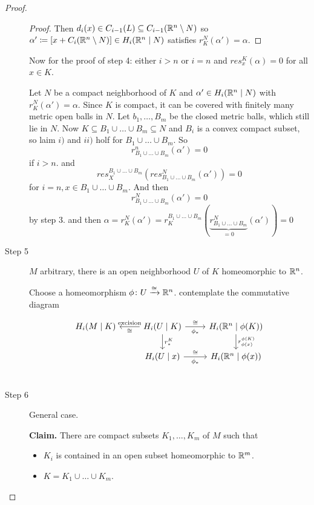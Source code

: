 \documentclass[language=english]{TemplateLecture}
\begin{document}
\begin{proof}
\begin{description}
\begin{proof}
        Then \(d_i(x) \in C_{i-1}(L) \subseteq C_{i-1}(\mathbb{R}^n \setminus N)\) so \(\alpha' \coloneq [x + C_i(\mathbb{R}^n \setminus N)] \in H_i(\mathbb{R}^n \mid N)\) satisfies \(r_K^N(\alpha') = \alpha\).
    \end{proof}

    Now for the proof of step 4: either \(i > n\) or \(i = n\) and \(res_x^K(\alpha) = 0\) for all \(x \in K\).

    Let \(N\) be a compact neighborhood of \(K\) and \(\alpha' \in H_i(\mathbb{R}^n \mid N)\) with \(r_K^N(\alpha') = \alpha\). Since \(K\) is  compact, it can be covered with finitely many metric open balls in \(N\). Let \(b_1, \dots, B_m\) be the closed metric balls, whlich still lie in \(N\). Now
    \(K \subseteq B_1 \cup \dots \cup B_m \subseteq N\) and \(B_i\) is a convex compact subset, so laim \(i)\) and \(ii)\) holf for \(B_1 \cup \dots \cup B_m\). So
    \[r_{B_1 \cup \dots \cup B_m}^n(\alpha') = 0\]
    if \(i > n\). and
    \[res_X^{B_1\cup \dots \cup B_m}(res_{B_1 \cup \dots \cup B_m}^N(\alpha')) = 0\]
    for \(i = n, x \in B_1 \cup \dots \cup B_m\). And then
    \[r_{B_1 \cup \dots \cup B_m}^N(\alpha') = 0\] by step 3. and then \(\alpha = r_K^N(\alpha') = r_K^{B_1 \cup \dots \cup B_m}(\underbrace{r_{B_1\cup \dots \cup B_m}^N}_{= 0}(\alpha')) = 0\)

    \item[Step 5] \(M\) arbitrary, there is an open neighborhood \(U\) of \(K\) homeomorphic to \(\mathbb{R}^n\).
    
    Choose a homeomorphism \(\phi\colon U \xrightarrow{\cong} \mathbb{R}^n\). contemplate the commutative diagram

    \[\begin{tikzcd}
        H_i(M \mid K) & H_i(U \mid K)\ar[d, "r_*^K"]  \ar[l, "\cong", "\text{excision}"'] \ar[r, "\phi_*"', "\cong"] & H_i(\IR^n \mid \phi(K)) \ar[d, "r_{\phi(x)}^{\phi(K)}"] \\
        & H_i(U\mid x) \ar[r, "\cong", "\phi_*"'] & H_i(\IR^n \mid \phi(x)) \\
    \end{tikzcd}\]

    \item[Step 6] General case.
    
    \textbf{Claim.} There are compact subsets \(K_1, \dots, K_m\) of \(M\) such that
    \begin{itemize}
        \item \(K_i\) is contained in an open subset homeomorphic to \(\mathbb{R}^m\).
        \item \(K = K_1 \cup \dots \cup K_m\).
    \end{itemize}


\end{description}
\end{proof}
\end{document}
